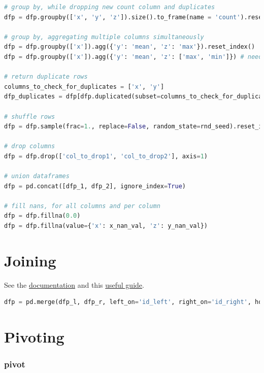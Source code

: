 \begin{lstlisting}[language=Python]
# group by, while dropping new count column and duplicates
dfp = dfp.groupby(['x', 'y', 'z']).size().to_frame(name = 'count').reset_index().drop(['count'], axis=1).drop_duplicates()

# group by, aggregating multiple columns simultaneously
dfp = dfp.groupby(['x']).agg({'y': 'mean', 'z': 'max'}).reset_index()
dfp = dfp.groupby(['x']).agg({'y': 'mean', 'z': ['max', 'min']}) # needs multi-index

# return duplicate rows
columns_to_check_for_duplicates = ['x', 'y']
dfp_duplicates = dfp[dfp.duplicated(subset=columns_to_check_for_duplicates, keep=False)]

# shuffle rows
dfp = dfp.sample(frac=1., replace=False, random_state=rnd_seed).reset_index(drop=True)

# drop columns
dfp = dfp.drop(['col_to_drop1', 'col_to_drop2'], axis=1)

# union dataframes
dfp = pd.concat([dfp_1, dfp_2], ignore_index=True)

# fill nans, for all columns and per column
dfp = dfp.fillna(0.0)
dfp = dfp.fillna(value={'x': x_nan_val, 'z': y_nan_val})
\end{lstlisting}

\clearpage

\section{Joining}
\label{pandas:join}

\noindent See the \href{https://pandas.pydata.org/pandas-docs/stable/user_guide/merging.html#database-style-dataframe-or-named-series-joining-merging}{documentation}
and this
\href{https://chrisalbon.com/code/python/data_wrangling/pandas_join_merge_dataframe/}{useful guide}.

\begin{lstlisting}[language=Python]
dfp = pd.merge(dfp_l, dfp_r, left_on='id_left', right_on='id_right', how='left')
\end{lstlisting}

\section{Pivoting}
\label{pandas:pivoting}

\subsubsection{pivot}
\label{pandas:pivoting:pivot}

